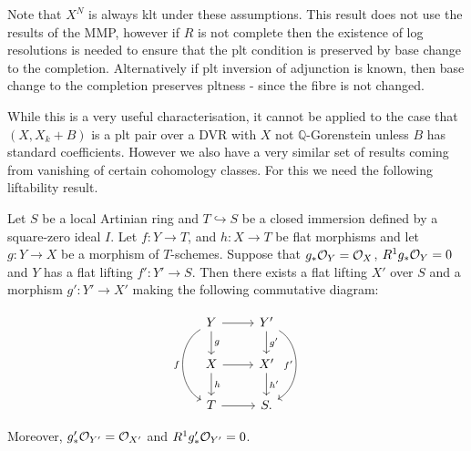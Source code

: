 Note that $X^{N}$ is always klt under these assumptions. This result does not use the results of the MMP, however if $R$ is not complete then the existence of log resolutions is needed to ensure that the plt condition is preserved by base change to the completion. Alternatively if plt inversion of adjunction is known, then base change to the completion preserves pltness - since the fibre is not changed. 

While this is a very useful characterisation, it cannot be applied to the case that $(X,X_{k}+B)$ is a plt pair over a DVR with $X$ not $\mathbb{Q}$-Gorenstein unless $B$ has standard coefficients. However we also have a very similar set of results coming from vanishing of certain cohomology classes. For this we need the following liftability result.

\begin{proposition}\label{push-lift}
	Let $S$ be a local Artinian ring and $T \hookrightarrow S$ be a closed immersion defined by a square-zero ideal $I$.  Let $f\colon Y \to T$, and $h\colon X \to T$ be flat morphisms and let $g\colon Y \to X$ be a morphism of $T$-schemes. 
	Suppose that $g_{*} \ox[Y]=\ox$, $R^{1}g_{*} \ox[Y] = 0$ and $Y$ has a flat lifting $f' \colon Y' \to S$. Then there exists a flat lifting $X'$ over $S$ and a morphism $g' \colon Y' \to X'$ making the following commutative diagram:
	
	\[\begin{tikzcd}
	Y \arrow[r] \arrow[d, "g"]  \arrow[bend right=60,swap, "f"]{dd}
	& Y' \arrow[d, "g'"] \arrow[bend left=60,swap, "f'"]{dd} \\
	X \arrow[d, "h"] \arrow[r] & X' \arrow[d, "h'"] \\
	T \arrow[r]                        & S    .                     
	\end{tikzcd}\]
	
	Moreover,  $g'_{*} \ox[Y']=\ox[X']$ and $R^{1}g'_{*} \ox[Y'] = 0$.
\end{proposition}


